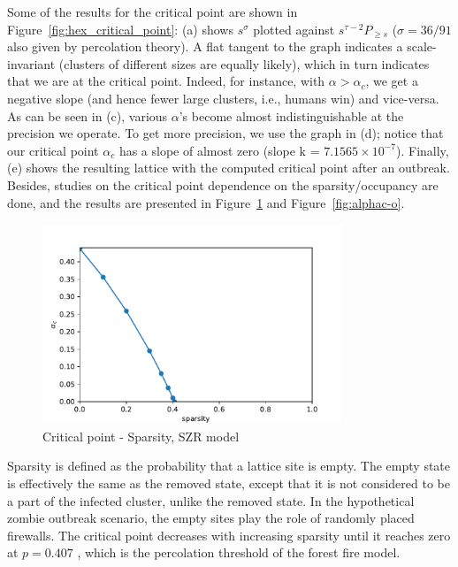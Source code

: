 \documentclass[11pt]{article}
\begin{document}
Some of the results for the critical point are shown in Figure~\ref{fig:hex_critical_point}: (a) shows $s^\sigma$ plotted against $s^{\tau-2}P_{\geq s}$ ($\sigma=36/91$ also given by percolation theory). A flat tangent to the graph indicates a scale-invariant (clusters of different sizes are equally likely), which in turn indicates that we are at the critical point. Indeed, for instance, with $\alpha > \alpha_c$, we get a negative slope (and hence fewer large clusters, i.e., humans win) and vice-versa. As can be seen in (c), various $\alpha$'s become almost indistinguishable at the precision we operate. To get more precision, we use the graph in (d); notice that our critical point $\alpha_c$ has a slope of almost zero (slope k = $7.1565 \times 10^{-7}$). Finally, (e) shows the resulting lattice with the computed critical point after an outbreak.\\

Besides, studies on the critical point dependence on the sparsity/occupancy are done, and the results are presented in Figure~\ref{fig:alphac-p} and Figure~\ref{fig:alphac-o}. \\

\begin{figure}[H]
    \centering
    \includegraphics[width=0.8\textwidth]{fig/sparsity_phase.pdf}
    \caption{Critical point - Sparsity, SZR model}
    \label{fig:alphac-p}
\end{figure}

Sparsity is defined as the probability that a lattice site is empty. The empty state is effectively the same as the removed state, except that it is not considered to be a part of the infected cluster, unlike the removed state. In the hypothetical zombie outbreak scenario, the empty sites play the role of randomly placed firewalls. The critical point decreases with increasing sparsity until it reaches zero at $p = 0.407$ \cite{comphys2019}, which is the percolation threshold of the forest fire model.\\
\end{document}
